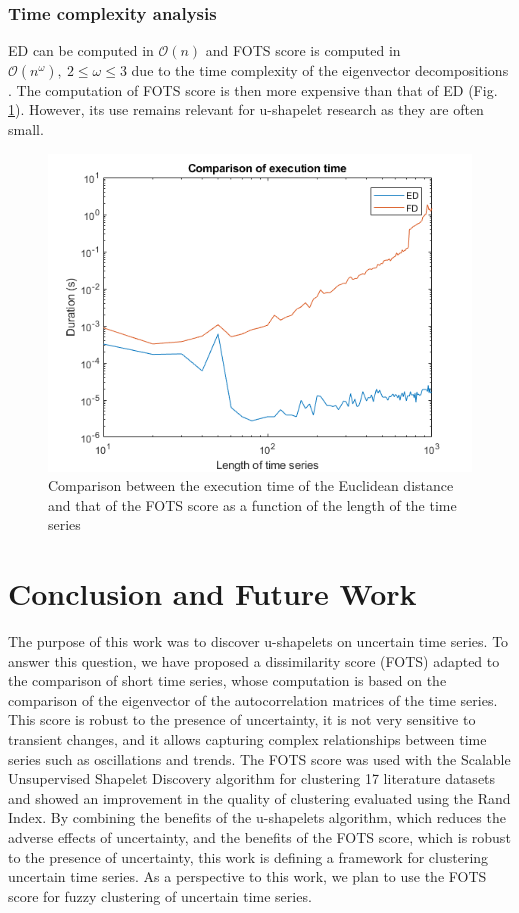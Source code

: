 \subsubsection{Time complexity analysis} ED can be computed in $\mathcal{O}(n)$ and  FOTS score is computed in $\mathcal{O}(n^\omega),\:2\leq\omega\leq3$ due to the time complexity of the eigenvector decompositions \cite{pan1999complexity}. The computation of FOTS score is then more expensive than that of ED (Fig. \ref{temps_ED_FOTS}). However, its use remains relevant for u-shapelet research as they are often small.


 \begin{figure}[h]
  \centering
   \includegraphics[scale=0.5]{images/temps_ED_FOTS}
    \caption{Comparison between the execution time of the Euclidean distance and that of the FOTS score as a function of the length of the time series}
  \label{temps_ED_FOTS}
  \end{figure}

\section{Conclusion and Future Work}
The purpose of this work was to discover u-shapelets on uncertain time series. To answer this question, we have proposed a dissimilarity score (FOTS) adapted to the comparison of short time series, whose computation is based on the comparison of the eigenvector of the autocorrelation matrices of the time series. This score is robust to the presence of uncertainty, it is not very sensitive to transient changes, and it allows capturing complex relationships between time series such as oscillations and trends. The FOTS score was used with the Scalable Unsupervised Shapelet Discovery algorithm for clustering 17 literature datasets and showed an improvement in the quality of clustering evaluated using the Rand Index.  By combining the benefits of the u-shapelets algorithm, which reduces the adverse effects of uncertainty, and the benefits of the FOTS score, which is robust to the presence of uncertainty, this work is defining a framework for clustering uncertain time series. As a perspective to this work, we plan to use the FOTS score for fuzzy clustering of uncertain time series.
